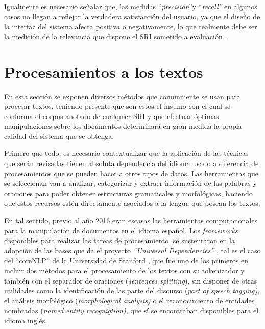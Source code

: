 \documentclass[
  12pt,
  openany]{book}
\begin{document}
Igualmente es necesario señalar que, las medidas ``\emph{precisión}''y ``\emph{recall''} en algunos casos no llegan a reflejar la verdadera satisfacción del usuario, ya que el diseño de la interfaz del sistema afecta positiva o negativamente, lo que realmente debe ser la medición de la relevancia que dispone el SRI sometido a evaluación \citep{manning2008}.

\hypertarget{PT}{%
\section{Procesamientos a los textos}\label{PT}}

En esta sección se exponen diversos métodos que comúnmente se usan para procesar textos, teniendo presente que son estos el insumo con el cual se conforma el corpus anotado \citep{desagulier2017} de cualquier SRI y que efectuar óptimas manipulaciones sobre los documentos determinará en gran medida la propia calidad del sistema que se obtenga.

Primero que todo, es necesario contextualizar que la aplicación de las técnicas que serán revisadas tienen absoluta dependencia del idioma usado a diferencia de procesamientos que se pueden hacer a otros tipos de datos. Las herramientas que se seleccionan van a analizar, categorizar y extraer información de las palabras y oraciones para poder obtener estructuras gramaticales y morfológicas, haciendo que estos recursos estén directamente asociados a la lengua que posean los textos.

En tal sentido, previo al año 2016 eran escasas las herramientas computacionales para la manipulación de documentos en el idioma español. Los \emph{frameworks} disponibles para realizar las tareas de procesamiento, se sustentaron en la adopción de las bases que da el proyecto \emph{``Universal Dependencies''} \citep{demarneffe2021}, tal es el caso del ``coreNLP'' de la Universidad de Stanford \citep{manning-etal-2014-stanford}, que fue uno de los primeros en incluir dos métodos para el procesamiento de los textos con su tokenizador y también con el separador de oraciones (\emph{sentences splitting}), sin disponer de otras utilidades como la identificación de las parte del discurso (\emph{part of speech tagging),} el análisis morfológico (\emph{morphological analysis)} \citep{straka2017} o el reconocimiento de entidades nombradas (\emph{named entity recognigtion),} que sí se encontraban disponibles para el idioma inglés.
\end{document}
